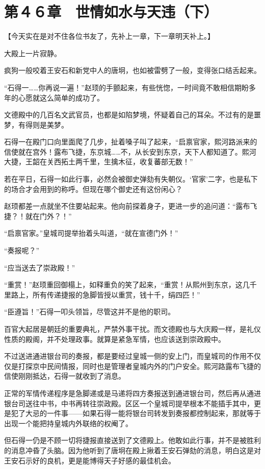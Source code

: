 \section{第４６章　世情如水与天违（下） }

【今天实在是对不住各位书友了，先补上一章，下一章明天补上。】

大殿上一片寂静。

疯狗一般咬着王安石和新党中人的唐坰，也如被雷劈了一般，变得张口结舌起来。

“石得一……你再说一遍！”赵顼的手颤起来，有些恍惚，一时间竟不敢相信期盼多年的心愿就这么简单的成功了。

文德殿中的几百名文武官员，也都是如陷梦境，怀疑着自己的耳朵。不过有的是噩梦，有得则是美梦。

石得一在殿门口向里面爬了几步，扯着嗓子叫了起来，“启禀官家，熙河路派来的信使就在宫外！露布飞捷，东京城……不，从长安到东京，天下人都知道了。熙河大捷，王韶在关西拓土两千里，生擒木征，收复蕃部无数！”

若在平日，石得一如此行事，必然会被御史弹劾有失朝仪。‘官家’二字，也是私下的场合才会用到的称呼。但现在哪个御史还有这份闲心？

赵顼都差一点就坐不住要站起来。他向前探着身子，更进一步的追问道：“露布飞捷？！就在门外？！”

“启禀官家。”皇城司提举抬着头叫道，“就在宣德门外！”

“奏报呢？”

“应当送去了崇政殿！”

“重赏！”赵顼重回御榻上，如释重负的笑了起来，“重赏！从熙州到东京，这几千里路上，所有传递捷报的急脚皆授以重赏，钱十千，绢四匹！”

“臣遵旨！”石得一叩头领旨，尽管这并不是他的职司。

百官大起居是朝廷的重要典礼，严禁外事干扰。而文德殿也与大庆殿一样，是礼仪性质的殿阁，并不处理政事。就算是紧急军情，也应该送到崇政殿中。

不过送进通进银台司的奏报，都是要经过皇城一侧的安上门，而皇城司的作用不仅仅是打探京中民间情报，同时也是管理者皇城内外的门户安全。熙河路露布飞捷的信使刚刚抵达，石得一就收到了消息。

正常的军情传递程序是急脚递或是马递将四方奏报送到通进银台司，然后再从通进银台司送往中书，中书再转往崇政殿。区区一个皇城司提举根本不能插手其中，更是犯了大忌的一件事——如果石得一能将银台司转发到奏报都控制起来，那就等于出现一个能把持皇城内外联络的权阉了。

但石得一仍是不顾一切将捷报直接送到了文德殿上。他敢如此行事，并不是被胜利的消息冲昏了头脑。因为他听到了唐坰在殿上揪着王安石弹劾的消息，明白这是对王安石示好的良机，更是能博得天子好感的最佳机会。

